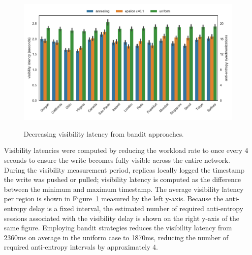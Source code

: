 \begin{figure}
    \begin{center}
        \includegraphics[width=5in]{figures/ch06_visibility_latency.pdf}
    \end{center}
    \renewcommand{\baselinestretch}{1}
    \small\normalsize

    \begin{quote}
        \caption[Visibility Latency]{Decreasing visibility latency from bandit approaches.}
        \label{fig:ch06_visibility_latency}
    \end{quote}
\end{figure}
\renewcommand{\baselinestretch}{2}
\small\normalsize

Visibility latencies were computed by reducing the workload rate to once
every 4 seconds to ensure the write becomes fully visible across the entire
network.
During the visibility measurement period, replicas locally logged the
timestamp the write was pushed or pulled; visibility latency is computed as
the difference between the minimum and maximum timestamp.
The average visibility latency per region is shown in
Figure~\ref{fig:ch06_visibility_latency} measured by the left y-axis.
Because the anti-entropy delay is a fixed interval, the estimated number of
required anti-entropy sessions associated with the visibility delay is shown
on the right y-axis of the same figure.
Employing bandit strategies reduces the visibility latency from 2360ms on
average in the uniform case to 1870ms, reducing the number of required
anti-entropy intervals by approximately 4.

